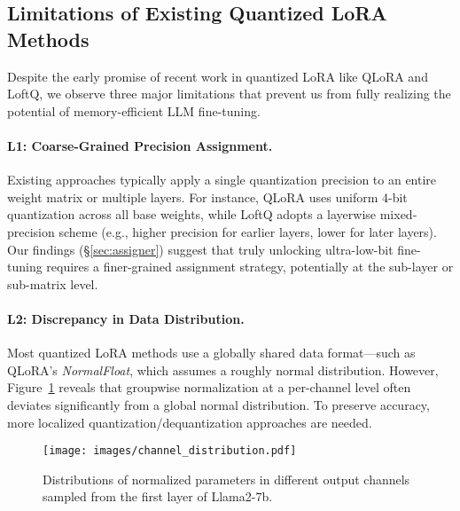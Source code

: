
\subsection{Limitations of Existing Quantized LoRA Methods} \label{sec:limitations}
Despite the early promise of recent work in quantized LoRA like QLoRA and LoftQ, we observe three major limitations that prevent us from fully realizing the potential of memory-efficient LLM fine-tuning. 

\paragraph{L1: Coarse-Grained Precision Assignment.}
Existing approaches typically apply a single quantization precision to an entire weight matrix or multiple layers. For instance, QLoRA uses uniform 4-bit quantization across all base weights, while LoftQ adopts a layerwise mixed-precision scheme (e.g., higher precision for earlier layers, lower for later layers). Our findings (\S\ref{sec:assigner}) suggest that truly unlocking ultra-low-bit fine-tuning requires a finer-grained assignment strategy, potentially at the sub-layer or sub-matrix level.

\paragraph{L2: Discrepancy in Data Distribution.}
Most quantized LoRA methods use a globally shared data format—such as QLoRA’s \textit{NormalFloat}, which assumes a roughly normal distribution. However, Figure~\ref{fig:channel_distribution} reveals that groupwise normalization at a per-channel level often deviates significantly from a global normal distribution. To preserve accuracy, more localized quantization/dequantization approaches are needed.


\begin{figure}[ht]
\begin{center}
\centerline{\texttt{[image: images/channel\_distribution.pdf]}}
\vskip -0.2in
\caption{Distributions of normalized parameters in different output channels sampled from the first layer of Llama2-7b.}
\label{fig:channel_distribution}
\end{center}
\vspace{-20pt}
\end{figure}


